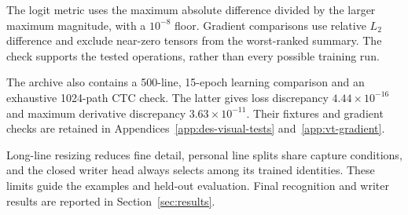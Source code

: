 The logit metric uses the maximum absolute difference divided by the larger maximum magnitude, with a $10^{-8}$ floor. Gradient comparisons use relative $L_2$ difference and exclude near-zero tensors from the worst-ranked summary. The check supports the tested operations, rather than every possible training run.

The archive also contains a 500-line, 15-epoch learning comparison and an exhaustive 1024-path CTC check. The latter gives loss discrepancy $4.44\times10^{-16}$ and maximum derivative discrepancy $3.63\times10^{-11}$. Their fixtures and gradient checks are retained in Appendices~\ref{app:des-visual-tests} and~\ref{app:vt-gradient}.

Long-line resizing reduces fine detail, personal line splits share capture conditions, and the closed writer head always selects among its trained identities. These limits guide the examples and held-out evaluation. Final recognition and writer results are reported in Section~\ref{sec:results}.
\FloatBarrier
